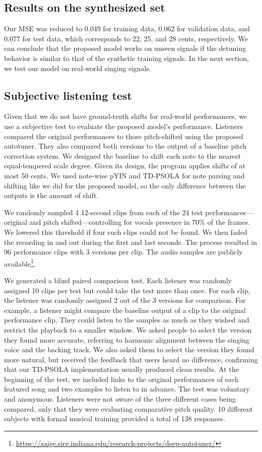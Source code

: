\subsection{Results on the synthesized set}
Our MSE was reduced to 0.049 for training data, 0.062 for validation data, and 0.077 for test data, which corresponds to 22, 25, and 28 cents, respectively. We can conclude that the proposed model works on unseen signals if the detuning behavior is similar to that of the synthetic training signals. In the next section, we test our model on real-world singing signals.

\subsection{Subjective listening test}
\label{sec:subjective-test}

Given that we do not have ground-truth shifts for real-world performances, we use a subjective test to evaluate the proposed model's performance. Listeners compared the original performances to those pitch-shifted using the proposed autotuner. They also compared both versions to the output of a baseline pitch correction system. We designed the baseline to shift each note to the nearest equal-tempered scale degree. Given its design, the program applies shifts of at most 50 cents. We used note-wise pYIN and TD-PSOLA for note parsing and shifting like we did for the proposed model, so the only difference between the outputs is the amount of shift.

We randomly sampled 4 12-second clips from each of the 24 test performances---original and pitch shifted---controlling for vocals presence in 70\% of the frames. We lowered this threshold if four such clips could not be found. We then faded the recording in and out during the first and last seconds. The process resulted in 96 performance clips with 3 versions per clip. The audio samples are publicly available\footnote{\href{https://saige.sice.indiana.edu/research-projects/deep-autotuner/}{https://saige.sice.indiana.edu/research-projects/deep-autotuner/}}.

We generated a blind paired comparison test. Each listener was randomly assigned 10 clips per test but could take the test more than once. For each clip, the listener was randomly assigned 2 out of the 3 versions for comparison. For example, a listener might compare the baseline output of a clip to the original performance clip. They could listen to the samples as much as they wished and restrict the playback to a smaller window. We asked people to select the version they found more accurate, referring to harmonic alignment between the singing voice and the backing track. We also asked them to select the version they found more natural, but received the feedback that users heard no difference, confirming that our TD-PSOLA implementation usually produced clean results. At the beginning of the test, we included links to the original performances of each featured song and two examples to listen to in advance. The test was voluntary and anonymous. Listeners were not aware of the three different cases being compared, only that they were evaluating comparative pitch quality. 10 different subjects with formal musical training provided a total of 138 responses. 

